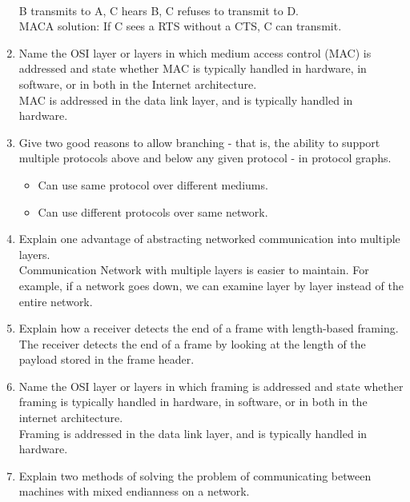 \documentclass[10pt, a4paper]{article}
\begin{document}
\begin{enumerate}
\\
    B transmits to A, C hears B, C refuses to transmit to D.\\
    MACA solution: If C sees a RTS without a CTS, C can transmit.
    \color{black}
\item\mbox{}Name the OSI layer or layers in which medium access control (MAC) is addressed and state whether MAC is typically handled in hardware, in software, or in both in the Internet architecture.\\
    \color{blue}
    MAC is addressed in the data link layer, and is typically handled in hardware.
    \color{black}
\item\mbox{}Give two good reasons to allow branching - that is, the ability to support multiple protocols above and below any given protocol - in protocol graphs.
    \color{blue}
    \begin{itemize}
    \item Can use same protocol over different mediums.
    \item Can use different protocols over same network.
    \end{itemize}
    \color{black}
\item\mbox{}Explain one advantage of abstracting networked communication into multiple layers.\\
    \color{blue}
    Communication Network with multiple layers is easier to maintain. For example, if a network goes down, we can examine layer by layer instead of the entire network.
    \color{black}
\item\mbox{}Explain how a receiver detects the end of a frame with length-based framing.\\
    \color{blue}
    The receiver detects the end of a frame by looking at the length of the payload stored in the frame header.
    \color{black}
\item\mbox{}Name the OSI layer or layers in which framing is addressed and state whether framing is typically handled in hardware, in software, or in both in the internet architecture.\\
    \color{blue}
    Framing is addressed in the data link layer, and is typically handled in hardware.
    \color{black}
\item\mbox{}Explain two methods of solving the problem of communicating between machines with mixed endianness on a network.
    \color{blue}

\end{enumerate}
\end{document}
